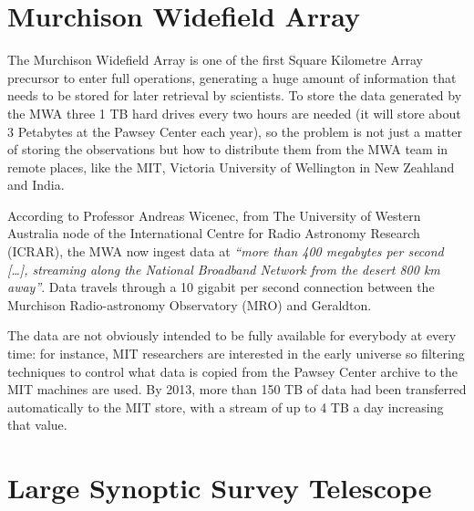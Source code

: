 


\section{Murchison Widefield Array} %
\label{sec:murchison_widefield_array}

The Murchison Widefield Array is
one of %
the first Square Kilometre Array precursor to enter full operations, generating a huge amount of information that needs to be stored for later retrieval by scientists. To store the data generated by the MWA three 1 TB hard drives every two hours are needed (it will store about 3 Petabytes at the Pawsey Center each year), so the
problem is not %
just a matter of storing the observations but how to distribute them from the MWA team in remote places, like
the MIT, %
Victoria University of Wellington in New Zeahland and India. 

According to Professor Andreas Wicenec, from The University of Western Australia node of the International Centre for Radio Astronomy Research (ICRAR),
the MWA %
now ingest data at \emph{``more than 400 megabytes per second [\dots{}], streaming along the National Broadband Network from the desert 800 km away''}. Data travels through a 10 gigabit per second connection between the Murchison Radio-astronomy Observatory (MRO) and
Geraldton.

The data are not obviously intended to be fully available for everybody at every time: for instance, MIT researchers are interested in the early universe so filtering techniques to control what data is copied from the Pawsey Center archive to the MIT machines are used. By 2013, more than 150 TB of data had been transferred automatically to the MIT store, with a stream of up to 4 TB a day increasing that value. 




\section{Large Synoptic Survey Telescope} %
\label{sec:large_synoptic_survey_telescope}

